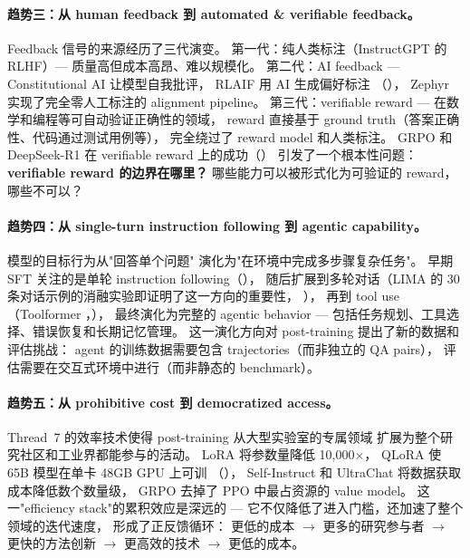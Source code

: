 \paragraph{趋势三：从 human feedback 到 automated \& verifiable feedback。}
Feedback 信号的来源经历了三代演变。
第一代：纯人类标注（InstructGPT 的 RLHF）---
质量高但成本高昂、难以规模化。
第二代：AI feedback ---
Constitutional AI \cite{bai2022constitutional} 让模型自我批评，
RLAIF \cite{lee2023rlaif} 用 AI 生成偏好标注
（），
Zephyr \cite{tunstall2023zephyr} 实现了完全零人工标注的 alignment pipeline。
第三代：verifiable reward ---
在数学和编程等可自动验证正确性的领域，
reward 直接基于 ground truth（答案正确性、代码通过测试用例等），
完全绕过了 reward model 和人类标注。
GRPO \cite{shao2024grpo} 和 DeepSeek-R1 \cite{deepseek2025r1}
在 verifiable reward 上的成功（）
引发了一个根本性问题：
\textbf{verifiable reward 的边界在哪里？}
哪些能力可以被形式化为可验证的 reward，哪些不可以？

\paragraph{趋势四：从 single-turn instruction following 到 agentic capability。}
模型的目标行为从"回答单个问题"
演化为"在环境中完成多步骤复杂任务"。
早期 SFT 关注的是单轮 instruction following（），
随后扩展到多轮对话（LIMA 的 30 条对话示例的消融实验即证明了这一方向的重要性，
），
再到 tool use（Toolformer \cite{schick2023toolformer}，），
最终演化为完整的 agentic behavior ---
包括任务规划、工具选择、错误恢复和长期记忆管理。
这一演化方向对 post-training 提出了新的数据和评估挑战：
agent 的训练数据需要包含 trajectories（而非独立的 QA pairs），
评估需要在交互式环境中进行（而非静态的 benchmark）。

\paragraph{趋势五：从 prohibitive cost 到 democratized access。}
Thread~7 的效率技术使得 post-training 从大型实验室的专属领域
扩展为整个研究社区和工业界都能参与的活动。
LoRA \cite{hu2022lora} 将参数量降低 10,000$\times$，
QLoRA \cite{dettmers2023qlora} 使 65B 模型在单卡 48GB GPU 上可训
（），
Self-Instruct \cite{wang2023selfinstruct} 和 UltraChat \cite{ding2023ultrachat}
将数据获取成本降低数个数量级，
GRPO \cite{shao2024grpo} 去掉了 PPO 中最占资源的 value model。
这一"efficiency stack"的累积效应是深远的 ---
它不仅降低了进入门槛，还加速了整个领域的迭代速度，
形成了正反馈循环：
更低的成本 $\rightarrow$ 更多的研究参与者 $\rightarrow$
更快的方法创新 $\rightarrow$ 更高效的技术 $\rightarrow$ 更低的成本。

